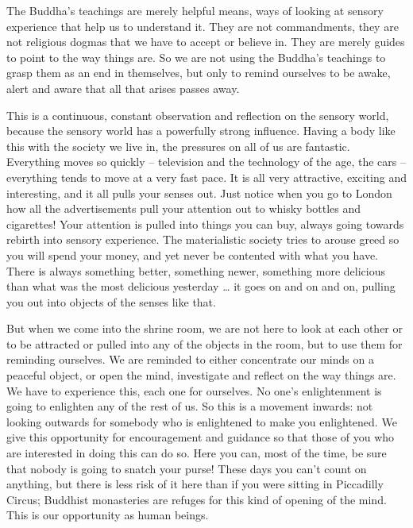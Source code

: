 The Buddha's teachings are merely helpful means, ways of looking at sensory experience that help us to understand it. They are not commandments, they are not religious dogmas that we have to accept or believe in. They are merely guides to point to the way things are. So we are not using the Buddha's teachings to grasp them as an end in themselves, but only to remind ourselves to be awake, alert and aware that all that arises passes away.

This is a continuous, constant observation and reflection on the sensory world, because the sensory world has a powerfully strong influence. Having a body like this with the society we live in, the pressures on all of us are fantastic. Everything moves so quickly -- television and the technology of the age, the cars -- everything tends to move at a very fast pace. It is all very attractive, exciting and interesting, and it all pulls your senses out. Just notice when you go to London how all the advertisements pull your attention out to whisky bottles and cigarettes! Your attention is pulled into things you can buy, always going towards rebirth into sensory experience. The materialistic society tries to arouse greed so you will spend your money, and yet never be contented with what you have. There is always something better, something newer, something more delicious than what was the most delicious yesterday \ldots{} it goes on and on and on, pulling you out into objects of the senses like that.

But when we come into the shrine room, we are not here to look at each other or to be attracted or pulled into any of the objects in the room, but to use them for reminding ourselves. We are reminded to either concentrate our minds on a peaceful object, or open the mind, investigate and reflect on the way things are. We have to experience this, each one for ourselves. No one's enlightenment is going to enlighten any of the rest of us. So this is a movement inwards: not looking outwards for somebody who is enlightened to make you enlightened. We give this opportunity for encouragement and guidance so that those of you who are interested in doing this can do so. Here you can, most of the time, be sure that nobody is going to snatch your purse! These days you can't count on anything, but there is less risk of it here than if you were sitting in Piccadilly Circus; Buddhist monasteries are refuges for this kind of opening of the mind. This is our opportunity as human beings.

